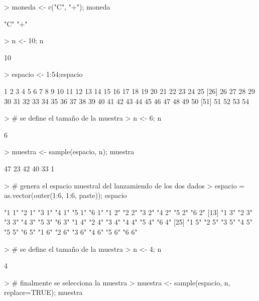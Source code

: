 \documentclass{article}
\begin{document}
\begin{Schunk}
\begin{Sinput}
> moneda <- c("C", "+"); moneda
\end{Sinput}
\begin{Soutput}
[1] "C" "+"
\end{Soutput}
\begin{Sinput}
> n <- 10; n
\end{Sinput}
\begin{Soutput}
[1] 10
\end{Soutput}
\begin{Sinput}
> espacio <- 1:54;espacio
\end{Sinput}
\begin{Soutput}
 [1]  1  2  3  4  5  6  7  8  9 10 11 12 13 14 15 16 17 18 19 20 21 22 23 24 25
[26] 26 27 28 29 30 31 32 33 34 35 36 37 38 39 40 41 42 43 44 45 46 47 48 49 50
[51] 51 52 53 54
\end{Soutput}
\begin{Sinput}
> # se define el tamaño de la muestra
> n <- 6; n
\end{Sinput}
\begin{Soutput}
[1] 6
\end{Soutput}
\begin{Sinput}
> muestra <- sample(espacio, n); muestra
\end{Sinput}
\begin{Soutput}
[1] 47 23 42 40 33  1
\end{Soutput}
\begin{Sinput}
> # genera el espacio muestral del lanzamiendo de los dos dados
> espacio = as.vector(outer(1:6, 1:6, paste)); espacio
\end{Sinput}
\begin{Soutput}
 [1] "1 1" "2 1" "3 1" "4 1" "5 1" "6 1" "1 2" "2 2" "3 2" "4 2" "5 2" "6 2"
[13] "1 3" "2 3" "3 3" "4 3" "5 3" "6 3" "1 4" "2 4" "3 4" "4 4" "5 4" "6 4"
[25] "1 5" "2 5" "3 5" "4 5" "5 5" "6 5" "1 6" "2 6" "3 6" "4 6" "5 6" "6 6"
\end{Soutput}
\begin{Sinput}
> # se define el tamaño de la muestra
> n <- 4; n
\end{Sinput}
\begin{Soutput}
[1] 4
\end{Soutput}
\begin{Sinput}
> # finalmente se selecciona la muestra
> muestra <- sample(espacio, n, replace=TRUE); muestra
\end{Sinput}
\begin{Soutput}

\end{Soutput}
\end{Schunk}
\end{document}
